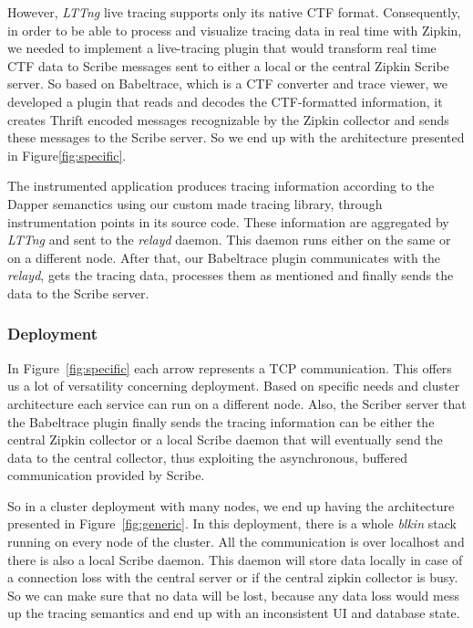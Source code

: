 \documentclass[a4paper,10pt,twocolumn]{article}
\begin{document}
However, \emph{LTTng} live tracing supports only its native CTF format.
Consequently, in order to be able to process and visualize tracing data in real
time with Zipkin, we needed to implement a live-tracing plugin that would
transform real time CTF data to Scribe messages sent to either a local or the
central Zipkin Scribe server. So based on Babeltrace\cite{bltrace}, which is a
CTF converter and trace viewer, we developed a plugin that reads and decodes the
CTF-formatted information, it creates Thrift\cite{thrift} encoded messages
recognizable by the Zipkin collector and sends these messages to the Scribe
server. So we end up with the architecture presented in
Figure\ref{fig:specific}.

The instrumented application produces tracing information according to the
Dapper semanctics using our custom made tracing library, through instrumentation
points in its source code. These information are aggregated by \emph{LTTng} and
sent to the \emph{relayd} daemon. This daemon runs either on the same or on a
different node. After that, our Babeltrace plugin communicates with the
\emph{relayd}, gets the tracing data, processes them as mentioned and finally
sends the data to the Scribe server. 

\subsubsection{Deployment} In Figure~\ref{fig:specific} each arrow represents a
TCP communication. This offers us a lot of versatility concerning deployment.
Based on specific needs and cluster architecture each service can run on a
different node.  Also, the Scriber server that the Babeltrace plugin finally
sends the tracing information can be either the central Zipkin collector or a
local Scribe daemon that will eventually send the data to the central collector,
thus exploiting the asynchronous, buffered communication provided by Scribe.

So in a cluster deployment with many nodes, we end up having the architecture
presented in Figure~\ref{fig:generic}. In this deployment, there is a whole
\emph{blkin} stack running on every node of the cluster. All the communication
is over localhost and there is also a local Scribe daemon. This daemon will
store data locally in case of a connection loss with the central server or if
the central zipkin collector is busy. So we can make sure that no data will be
lost, because any data loss would mess up the tracing semantics and end up with
an inconsistent UI and database state.
\end{document}
